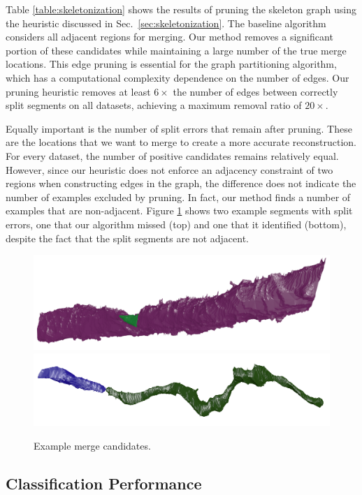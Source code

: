 Table \ref{table:skeletonization} shows the results of pruning the skeleton graph using the heuristic discussed in Sec.~\ref{sec:skeletonization}. The baseline algorithm considers all adjacent regions for merging. Our method removes a significant portion of these candidates while maintaining a large number of the true merge locations. This edge pruning is essential for the graph partitioning algorithm, which has a computational complexity dependence on the number of edges. Our pruning heuristic removes at least $6\times$ the number of edges between correctly split segments on all datasets, achieving a maximum removal ratio of $20\times$.

Equally important is the number of split errors that remain after pruning. These are the locations that we want to merge to create a more accurate reconstruction. For every dataset, the number of positive candidates  remains relatively equal. 
However, since our heuristic does not enforce an adjacency constraint of two regions when constructing edges in the graph, the difference does not indicate the number of examples excluded by pruning. In fact, our method finds a number of examples that are non-adjacent. Figure \ref{fig:skeleton-results} shows two example segments with split errors, one that our algorithm missed (top) and one that it identified (bottom), despite the fact that the split segments are not adjacent.

\begin{figure}[h!]
	\centering
	\includegraphics[width=0.85\linewidth]{./figures/merge_candidate1.png}
	\includegraphics[width=0.85\linewidth]{./figures/merge_candidate2.png}
	\caption{Example merge candidates.}
	\label{fig:skeleton-results}
\end{figure}


\subsection{Classification Performance}

